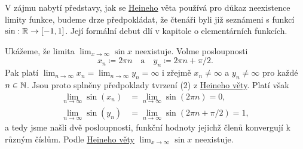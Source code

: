\begin{example}{}{}
 V zájmu nabytí představy, jak se \hyperref[thm:heineho]{Heineho} věta používá
 pro důkaz neexistence limity funkce, budeme drze předpokládat, že čtenáři byli
 již seznámeni s funkcí $\mathrm{sin}:\mathbb{R} \to [-1,1]$. Její formální debut dlí v
 kapitole o elementárních funkcích. %

 Ukážeme, že limita $\lim_{x \to \infty} \sin x$ neexistuje. Volme posloupnosti
 \[
  x_n \coloneqq 2\pi n \quad \text{a} \quad y_n \coloneqq 2\pi n + \pi / 2.
 \]
 Pak platí $\lim_{n \to \infty} x_n = \lim_{n \to \infty} y_n = \infty$ i zřejmě
 $x_n \neq \infty$ a $y_n \neq \infty$ pro každé $n \in \mathbb{N}$. Jsou proto splněny
 předpoklady tvrzení (2) z \hyperref[thm:heineho]{Heineho věty}. Platí však
 \begin{align*}
  \lim_{n \to \infty} \sin(x_n) &= \lim_{n \to \infty} \sin(2\pi n) = 0,\\
  \lim_{n \to \infty} \sin(y_n) &= \lim_{n \to \infty} \sin(2\pi n + \pi / 2) =
  1,
 \end{align*}
 a tedy jsme našli dvě posloupnosti, funkční hodnoty jejichž členů konvergují k
 různým číslům. Podle \hyperref[thm:heineho]{Heineho věty} $\lim_{x \to \infty}
 \sin x$ neexistuje.
\end{example}

